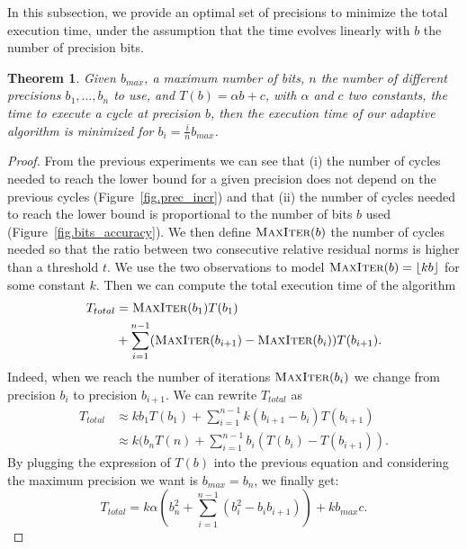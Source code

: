 \documentclass[10pt,conference]{IEEEtran}
\newtheorem{theorem}{Theorem}
\begin{document}
   In this subsection, we provide an optimal set of precisions to minimize the total execution time, under the assumption that the time evolves linearly with $b$ the number of precision bits.
   
   \begin{theorem}
     Given $b_{max}$, a maximum number of bits, $n$ the number of different precisions $b_1,\dots,b_n$ to use, and $T(b)=\alpha b+c$, with $\alpha$ and $c$ two constants, the time to execute a cycle at precision $b$, then
     the execution time of our adaptive algorithm is minimized for $b_i = \frac{i}{n}b_{max}$.
   \end{theorem}

   \begin{proof}
   From the previous experiments we can see that (i) the number of cycles needed to reach the lower bound for a given precision does not depend on the previous cycles (Figure~\ref{fig.prec_incr}) and that (ii) the number of cycles
   needed to reach the lower bound is proportional to the number of bits $b$ used (Figure~\ref{fig.bits_accuracy}). We then define $\textsc{MaxIter}(b)$ the number of cycles needed so that the ratio between two consecutive
   relative residual norms is higher than a threshold $t$. We use the two observations to model $\textsc{MaxIter}(b) = \lfloor kb \rfloor$ for some constant $k$.
   Then we can compute the total execution time of the algorithm
   \begin{align*}
   T_{total}& = \textsc{MaxIter}(b_1)T(b_1)\\
   & +  \sum\limits_{i=1}^{n-1} (\textsc{MaxIter}(b_{i+1})-\textsc{MaxIter}(b_i))T(b_{i+1}).
   \end{align*}
   Indeed, when we reach the number of iterations $\textsc{MaxIter}(b_i)$ we change from precision $b_i$ to precision $b_{i+1}$.
   We can rewrite $T_{total}$ as
   \begin{align*}
    T_{total} &\approx k b_{1} T(b_1) + \sum\limits_{i=1}^{n-1} k(b_{i+1}-b_{i})T(b_{i+1})\\
	    & \approx k ( b_{n}T(n) + \sum\limits_{i=1}^{n-1} b_i ( T(b_i) - T(b_{i+1})).
   \end{align*}
   By plugging the expression of $T(b)$ into the previous equation and considering the maximum precision we want is $b_{max}=b_n$, we finally get:
   \begin{equation}
    T_{total}  = k\alpha\left(b_n^2 + \sum\limits_{i=1}^{n-1} (b_i^2 - b_i b_{i+1})\right) + kb_{max}c.
   \end{equation}
   

\end{proof}
\end{document}
